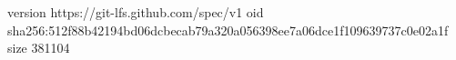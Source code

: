 version https://git-lfs.github.com/spec/v1
oid sha256:512f88b42194bd06dcbecab79a320a056398ee7a06dce1f109639737c0e02a1f
size 381104
